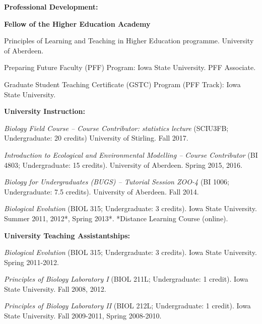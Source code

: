 \documentclass[letterpaper]{article}
\renewenvironment{itemize}{
  \begin{list}{}{
    \setlength{\leftmargin}{1.5em}
  }
}{
  \end{list}
}
\begin{document}
\begin{itemize}
\item {\bf Professional Development:}
\begin{itemize}
\item[$\bullet$]{{\bf Fellow of the Higher Education Academy}}
\item[$\bullet$]{Principles of Learning and Teaching in Higher Education programme. University of Aberdeen.}
\item[$\bullet$]{Preparing Future Faculty (PFF) Program: Iowa State University. PFF Associate.}
\item[$\bullet$]{Graduate Student Teaching Certificate (GSTC) Program (PFF Track): Iowa State University.}
\end{itemize}

\item {\bf University Instruction:}
\begin{itemize}
\item[$\bullet$]{{\it Biology Field Course -- Course Contributor: statistics lecture} (SCIU3FB; Undergraduate: 20 credits) University of Stirling. Fall 2017.}
\item[$\bullet$]{{\it Introduction to Ecological and Environmental Modelling -- Course Contributor} (BI 4803; Undergraduate: 15 credits). University of Aberdeen. Spring 2015, 2016.}
\item[$\bullet$]{{\it Biology for Undergraduates (BUGS) -- Tutorial Session ZOO-4} (BI 1006; Undergraduate: 7.5 credits). University of Aberdeen. Fall 2014.}
\item[$\bullet$]{{\it Biological Evolution} (BIOL 315; Undergraduate: 3 credits). Iowa State University. Summer 2011, 2012*, Spring 2013*. *Distance Learning Course (online).}
\end{itemize}

\item {\bf University Teaching Assistantships:}
\begin{itemize}
\item[$\bullet$]{{\it Biological Evolution} (BIOL 315; Undergraduate: 3 credits). Iowa State University. Spring 2011-2012.}
\item[$\bullet$]{{\it Principles of Biology Laboratory I} (BIOL 211L; Undergraduate: 1 credit). Iowa State University. Fall 2008, 2012.}
\item[$\bullet$]{{\it Principles of Biology Laboratory II} (BIOL 212L; Undergraduate: 1 credit). Iowa State University. Fall 2009-2011, Spring 2008-2010.}
\end{itemize}

\end{itemize}
\end{document}
